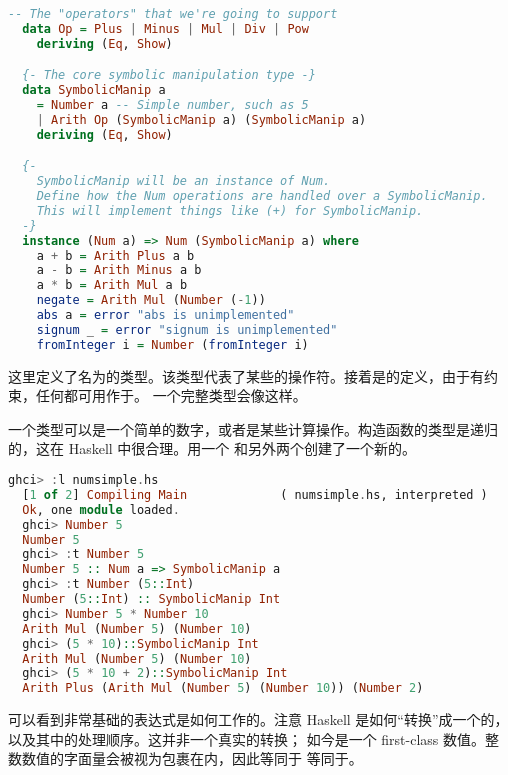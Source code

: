 \documentclass[./main.tex]{subfiles}
\begin{document}
\begin{lstlisting}[language=Haskell]
  -- The "operators" that we're going to support
  data Op = Plus | Minus | Mul | Div | Pow
    deriving (Eq, Show)

  {- The core symbolic manipulation type -}
  data SymbolicManip a
    = Number a -- Simple number, such as 5
    | Arith Op (SymbolicManip a) (SymbolicManip a)
    deriving (Eq, Show)

  {-
    SymbolicManip will be an instance of Num.
    Define how the Num operations are handled over a SymbolicManip.
    This will implement things like (+) for SymbolicManip.
  -}
  instance (Num a) => Num (SymbolicManip a) where
    a + b = Arith Plus a b
    a - b = Arith Minus a b
    a * b = Arith Mul a b
    negate = Arith Mul (Number (-1))
    abs a = error "abs is unimplemented"
    signum _ = error "signum is unimplemented"
    fromInteger i = Number (fromInteger i)
\end{lstlisting}

这里定义了名为的类型。该类型代表了某些的操作符。接着是的定义，由于有约束，任何都可用作于。
一个完整类型会像这样。

一个类型可以是一个简单的数字，或者是某些计算操作。构造函数的类型是递归的，这在 Haskell 中很合理。用一个
和另外两个创建了一个新的。

\begin{lstlisting}[language=Haskell]
  ghci> :l numsimple.hs
  [1 of 2] Compiling Main             ( numsimple.hs, interpreted )
  Ok, one module loaded.
  ghci> Number 5
  Number 5
  ghci> :t Number 5
  Number 5 :: Num a => SymbolicManip a
  ghci> :t Number (5::Int)
  Number (5::Int) :: SymbolicManip Int
  ghci> Number 5 * Number 10
  Arith Mul (Number 5) (Number 10)
  ghci> (5 * 10)::SymbolicManip Int
  Arith Mul (Number 5) (Number 10)
  ghci> (5 * 10 + 2)::SymbolicManip Int
  Arith Plus (Arith Mul (Number 5) (Number 10)) (Number 2)
\end{lstlisting}

可以看到非常基础的表达式是如何工作的。注意 Haskell 是如何“转换”成一个的，以及其中的处理顺序。这并非一个真实的转换；
如今是一个 first-class 数值。整数数值的字面量会被视为包裹在内，因此等同于
等同于。
\end{document}
